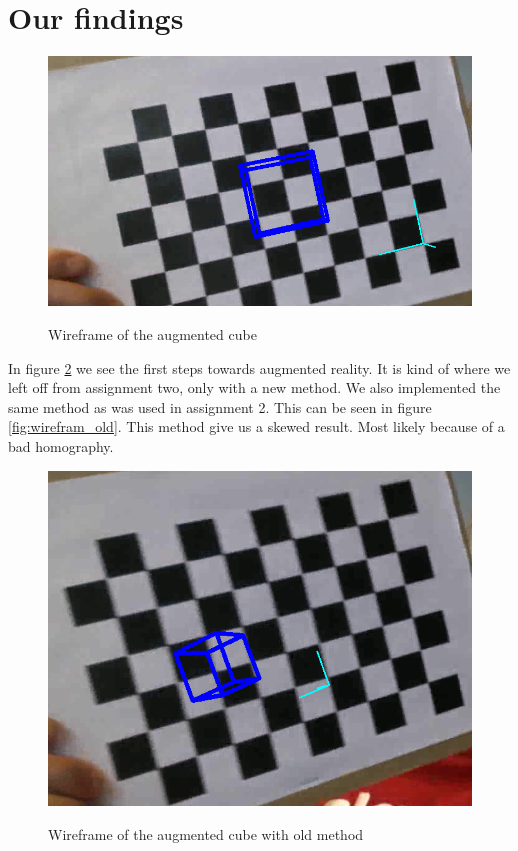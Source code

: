 \section{Our findings}
\label{sec:our_finding}

\begin{figure}[!htbp]
    \includegraphics{pics/wireframe.png}
    \label{fig:wireframe}
    \caption{Wireframe of the augmented cube}
\end{figure}
In figure \ref{fig:wireframe} we see the first steps towards augmented reality.
It is kind of where we left off from assignment two, only with a new method. We
also implemented the same method as was used in assignment 2. This can be seen
in figure \ref{fig:wirefram_old}. This method give us a skewed result. Most
likely because of a bad homography. 

\begin{figure}[!htbp]
    \includegraphics{pics/wireframeOld.png}
    \label{fig:wireframe}
    \caption{Wireframe of the augmented cube with old method}
\end{figure}

